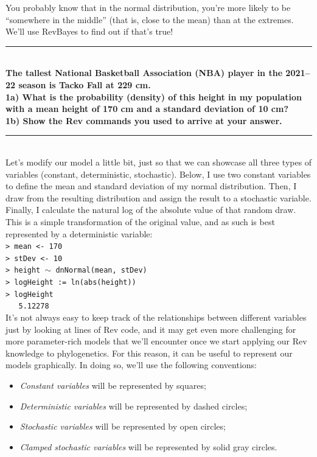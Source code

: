 \documentclass[12pt]{article}
\begin{document}
\noindent You probably know that in the normal distribution, you're more likely to be ``somewhere in the middle'' (that is, close to the mean) than at the extremes. We'll use RevBayes to find out if that's true! \\

\hrule
\ \\[1ex]
\textbf{The tallest National Basketball Association (NBA) player in the 2021--22 season is Tacko Fall at 229 cm.} \\

\noindent\textbf{1a) What is the probability (density) of this height in my population with a mean height of 170 cm and a standard deviation of 10 cm?} \\

\noindent\textbf{1b) Show the Rev commands you used to arrive at your answer.} \\
\hrule
\ \\[1ex]
\noindent Let's modify our model a little bit, just so that we can showcase all three types of variables (constant, deterministic, stochastic). Below, I use two constant variables to define the mean and standard deviation of my normal distribution. Then, I draw from the resulting distribution and assign the result to a stochastic variable. Finally, I calculate the natural log of the absolute value of that random draw. This is a simple transformation of the original value, and as such is best represented by a deterministic variable: \\

\indent \texttt{> mean <- 170} \\
\indent \texttt{> stDev <- 10} \\
\indent \texttt{> height {\footnotesize $\sim$} dnNormal(mean, stDev)} \\
\indent \texttt{> logHeight := ln(abs(height))} \\
\indent \texttt{> logHeight} \\
\indent \texttt{\ \ \ 5.12278} \\ 

\noindent It's not always easy to keep track of the relationships between different variables just by looking at lines of Rev code, and it may get even more challenging for more parameter-rich models that we'll encounter once we start applying our Rev knowledge to phylogenetics. For this reason, it can be useful to represent our models graphically. In doing so, we'll use the following conventions:

\begin{itemize}
\setlength\itemsep{-0.1em}
\item \textit{Constant variables} will be represented by squares;
\item \textit{Deterministic variables} will be represented by dashed circles;
\item \textit{Stochastic variables} will be represented by open circles;
\item \textit{Clamped stochastic variables} will be represented by solid gray circles.
\end{itemize}
\end{document}
